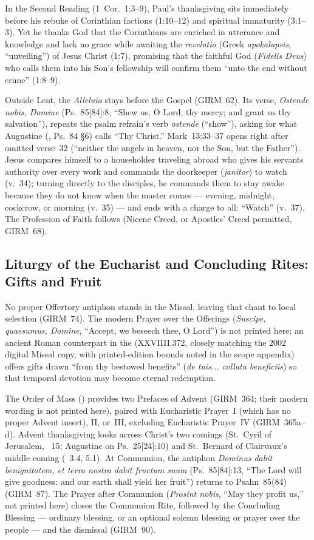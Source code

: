 In the Second Reading (1~Cor.~1:3--9), Paul's thanksgiving sits immediately before his rebuke of Corinthian factions (1:10--12) and spiritual immaturity (3:1--3). Yet he thanks God that the Corinthians are enriched in utterance and knowledge and lack no grace while awaiting the \emph{revelatio} (Greek \emph{apokalupsis}, ``unveiling'') of Jesus Christ (1:7), promising that the faithful God (\emph{Fidelis Deus}) who calls them into his Son's fellowship will confirm them ``unto the end without crime'' (1:8--9).

Outside Lent, the \emph{Alleluia} stays before the Gospel (GIRM~62). Its verse, \emph{Ostende nobis, Domine} (Ps.~85[84]:8, ``Shew us, O Lord, thy mercy; and grant us thy salvation''), repeats the psalm refrain's verb \emph{ostende} (``show''), asking for what Augustine (, Ps.~84 §6) calls ``Thy Christ.'' Mark~13:33--37 opens right after omitted verse~32 (``neither the angels in heaven, nor the Son, but the Father''). Jesus compares himself to a householder traveling abroad who gives his servants authority over every work and commands the doorkeeper (\emph{janitor}) to watch (v.~34); turning directly to the disciples, he commands them to stay awake because they do not know when the master comes --- evening, midnight, cockcrow, or morning (v.~35) --- and ends with a charge to all: ``Watch'' (v.~37). The Profession of Faith follows (Nicene Creed, or Apostles' Creed permitted, GIRM~68).

\subsection{Liturgy of the Eucharist and Concluding Rites: Gifts and Fruit}

No proper Offertory antiphon stands in the Missal, leaving that chant to local selection (GIRM~74). The modern Prayer over the Offerings (\emph{Suscipe, quaesumus, Domine}, ``Accept, we beseech thee, O Lord'') is not printed here; an ancient Roman counterpart in the  (XXVIIII.372, closely matching the 2002 digital Missal copy, with printed-edition bounds noted in the scope appendix) offers gifts drawn ``from thy bestowed benefits'' (\emph{de tuis... collata beneficiis}) so that temporal devotion may become eternal redemption.

The Order of Mass () provides two Prefaces of Advent (GIRM~364; their modern wording is not printed here), paired with Eucharistic Prayer~I (which has no proper Advent insert), II, or~III, excluding Eucharistic Prayer~IV (GIRM~365a--d). Advent thanksgiving looks across Christ's two comings (St.~Cyril of Jerusalem, ~15; Augustine on Ps.~25[24]:10) and St.~Bernard of Clairvaux's middle coming (~3.4, 5.1). At Communion, the antiphon \emph{Dominus dabit benignitatem, et terra nostra dabit fructum suum} (Ps.~85[84]:13, ``The Lord will give goodness: and our earth shall yield her fruit'') returns to Psalm~85(84) (GIRM~87). The Prayer after Communion (\emph{Prosint nobis}, ``May they profit us,'' not printed here) closes the Communion Rite, followed by the Concluding Blessing --- ordinary blessing, or an optional solemn blessing or prayer over the people --- and the dismissal (GIRM~90).

